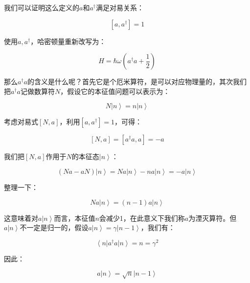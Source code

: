 我们可以证明这么定义的$a$和$a^\dagger$满足对易关系：

\begin{equation}
\left[ a, a^\dagger  \right] = 1
\end{equation}

使用$a, a^\dagger$，哈密顿量重新改写为：

\begin{equation}
H = \hbar \omega \left( a^\dagger a + \frac{1}{2} \right)
\end{equation}

那么$a^\dagger a$的含义是什么呢？首先它是个厄米算符，是可以对应物理量的，其次我们把$a^\dagger a$记做数算符$N$，假设它的本征值问题可以表示为：

\begin{equation}
N \left| n \right\rangle = n \left| n \right\rangle
\end{equation}

考虑对易式$\left[ N, a \right]$，利用$\left[ a, a^\dagger \right] = 1$，可得：

\begin{equation*}
\left[ N, a \right]  = \left[ a^\dagger a , a \right] = - a
\end{equation*}

我们把$\left[ N, a \right] $作用于$N$的本征态$\left| n \right\rangle$：

\begin{equation*}
\left( N a - a N \right) \left| n \right\rangle = N a \left| n \right\rangle - n a \left| n \right\rangle = - a \left| n \right\rangle
\end{equation*}

整理一下：

\begin{equation}
N a \left| n \right\rangle = (n -1) a \left| n \right\rangle
\end{equation}

这意味着对$a \left| n \right\rangle$而言，本征值$n$会减少1，在此意义下我们称$a$为湮灭算符。但$a \left| n \right\rangle$不一定是归一的，假设$a \left| n \right\rangle = \gamma \left| n -1 \right\rangle$，我们有：

\begin{equation*}
\left\langle n \right| a^\dagger a \left| n \right\rangle = n = \gamma^2
\end{equation*}

因此：

\begin{equation}
a \left| n \right\rangle = \sqrt{n} \left| n -1 \right\rangle
\end{equation}

